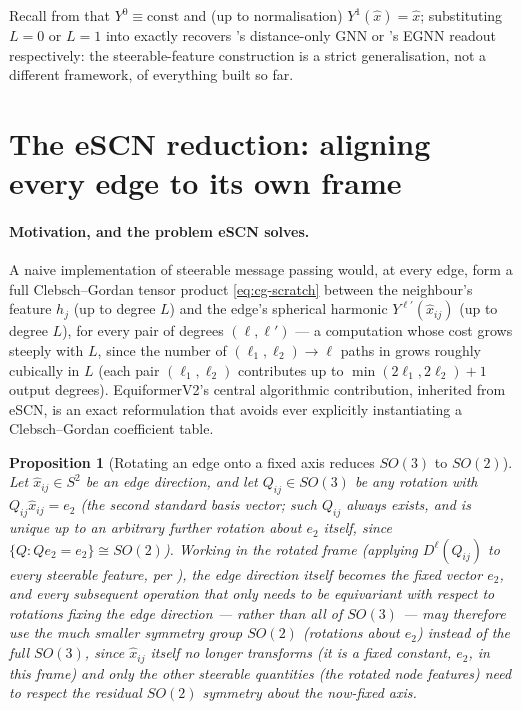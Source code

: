\documentclass[11pt,a4paper]{report}
\newtheorem{proposition}[proposition]{Proposition}
\theoremstyle{definition}
\theoremstyle{remark}
\begin{document}
Recall from  that $Y^0\equiv\mathrm{const}$ and
(up to normalisation) $Y^1(\hat x)=\hat x$; substituting $L=0$ or $L=1$ into
 exactly recovers 's
distance-only GNN or 's EGNN readout respectively:
the steerable-feature construction is a strict generalisation, not a
different framework, of everything built so far.

\section{The eSCN reduction: aligning every edge to its own frame}
\label{sec:equiformer-frame}

\paragraph{Motivation, and the problem eSCN solves.} A naive
implementation of steerable message passing would, at every edge, form a
full Clebsch--Gordan tensor product \eqref{eq:cg-scratch} between the
neighbour's feature $h_j$ (up to degree $L$) and the edge's spherical
harmonic $Y^{\ell'}(\hat x_{ij})$ (up to degree $L$), for every pair of
degrees $(\ell,\ell')$ --- a computation whose cost grows steeply with $L$,
since the number of $(\ell_1,\ell_2)\to\ell$ paths in
 grows roughly cubically in $L$ (each pair
$(\ell_1,\ell_2)$ contributes up to $\min(2\ell_1,2\ell_2)+1$ output
degrees). EquiformerV2's central algorithmic contribution, inherited from
eSCN, is an exact reformulation that avoids ever explicitly instantiating a
Clebsch--Gordan coefficient table.

\begin{proposition}[Rotating an edge onto a fixed axis reduces $SO(3)$ to $SO(2)$]
\label{prop:esc-reduction}
Let $\hat x_{ij}\in S^2$ be an edge direction, and let $Q_{ij}\in SO(3)$ be
\emph{any} rotation with $Q_{ij}\hat x_{ij}=e_2$ (the \emph{second} standard basis
vector; such $Q_{ij}$ always exists, and is unique up to an arbitrary
further rotation about $e_2$ itself, since $\{Q:Qe_2=e_2\}\cong SO(2)$).
Working in the rotated frame (applying $D^\ell(Q_{ij})$ to every steerable
feature, per ), the edge direction itself
becomes the \emph{fixed} vector $e_2$, and \emph{every} subsequent
operation that only needs to be equivariant with respect to rotations
fixing the edge direction --- rather than all of $SO(3)$ --- may
therefore use the much smaller symmetry group $SO(2)$ (rotations about
$e_2$) instead of the full $SO(3)$, since $\hat x_{ij}$ itself no longer
transforms (it is a fixed constant, $e_2$, in this frame) and only the
\emph{other} steerable quantities (the rotated node features) need to
respect the residual $SO(2)$ symmetry about the now-fixed axis.
\end{proposition}
\end{document}
